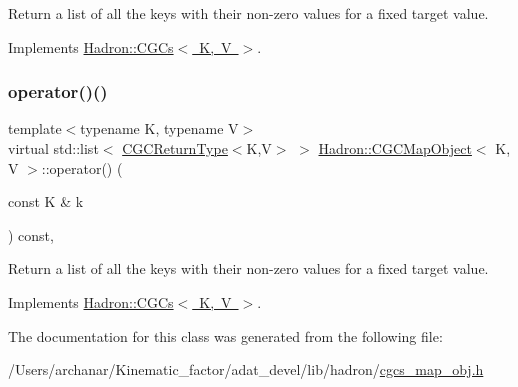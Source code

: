 Return a list of all the keys with their non-\/zero values for a fixed target value. 



Implements \mbox{\hyperlink{classHadron_1_1CGCs_a8d2d80be37b603359708ebdd5923ff47}{Hadron\+::\+C\+G\+Cs$<$ K, V $>$}}.

\mbox{\label{classHadron_1_1CGCMapObject_aeb342dc81f17743a25b969f540db4edf}} 
\subsubsection{\texorpdfstring{operator()()}{operator()()}\hspace{0.1cm}{\footnotesize\ttfamily [4/4]}}
{\footnotesize\ttfamily template$<$typename K, typename V$>$ \\
virtual std\+::list$<$ \mbox{\hyperlink{structHadron_1_1CGCReturnType}{C\+G\+C\+Return\+Type}}$<$K,V$>$ $>$ \mbox{\hyperlink{classHadron_1_1CGCMapObject}{Hadron\+::\+C\+G\+C\+Map\+Object}}$<$ K, V $>$\+::operator() (\begin{DoxyParamCaption}\item[{const K \&}]{k }\end{DoxyParamCaption}) const\hspace{0.3cm}{\ttfamily [inline]}, {\ttfamily [virtual]}}



Return a list of all the keys with their non-\/zero values for a fixed target value. 



Implements \mbox{\hyperlink{classHadron_1_1CGCs_a8d2d80be37b603359708ebdd5923ff47}{Hadron\+::\+C\+G\+Cs$<$ K, V $>$}}.



The documentation for this class was generated from the following file\+:\begin{DoxyCompactItemize}
\item 
/\+Users/archanar/\+Kinematic\+\_\+factor/adat\+\_\+devel/lib/hadron/\mbox{\hyperlink{lib_2hadron_2cgcs__map__obj_8h}{cgcs\+\_\+map\+\_\+obj.\+h}}\end{DoxyCompactItemize}
